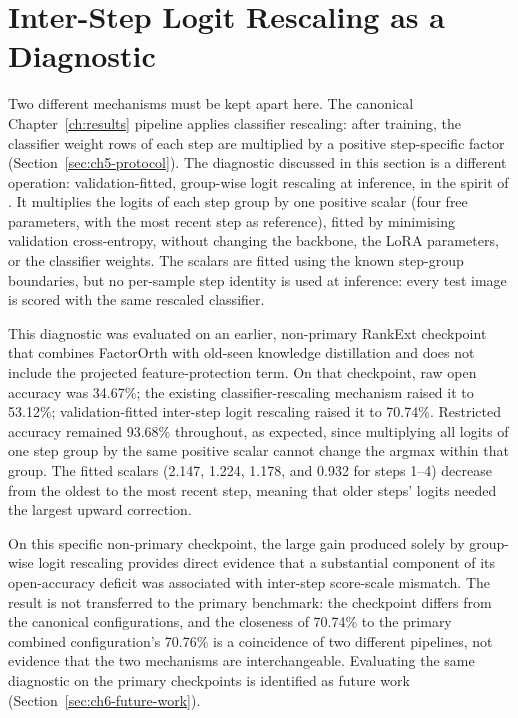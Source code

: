 \section{Inter-Step Logit Rescaling as a Diagnostic}
\label{sec:ch6-calibration}

Two different mechanisms must be kept apart here. The canonical
Chapter~\ref{ch:results} pipeline applies classifier rescaling: after
training, the classifier weight rows of each step are multiplied by a
positive step-specific factor (Section~\ref{sec:ch5-protocol}). The
diagnostic discussed in this section is a different operation:
validation-fitted, group-wise logit rescaling at inference, in the spirit of
\textcite{zhao2020maintaining}. It multiplies the logits of each step group
by one positive scalar (four free parameters, with the most recent step as
reference), fitted by minimising validation cross-entropy, without changing
the backbone, the LoRA parameters, or the classifier weights. The scalars
are fitted using the known step-group boundaries, but no per-sample step
identity is used at inference: every test image is scored with the same
rescaled classifier.

This diagnostic was evaluated on an earlier, non-primary RankExt checkpoint
that combines FactorOrth with old-seen knowledge distillation and does not
include the projected feature-protection term. On that checkpoint, raw open
accuracy was 34.67\%; the existing classifier-rescaling mechanism raised it
to 53.12\%; validation-fitted inter-step logit rescaling raised it to
70.74\%. Restricted accuracy remained 93.68\% throughout, as expected, since
multiplying all logits of one step group by the same positive scalar cannot
change the argmax within that group. The fitted scalars (2.147, 1.224,
1.178, and 0.932 for steps 1--4) decrease from the oldest to the most recent
step, meaning that older steps' logits needed the largest upward correction.

On this specific non-primary checkpoint, the large gain produced solely by
group-wise logit rescaling provides direct evidence that a substantial
component of its open-accuracy deficit was associated with inter-step
score-scale mismatch. The result is not transferred to the primary
benchmark: the checkpoint differs from the canonical configurations, and
the closeness of 70.74\% to the primary combined configuration's 70.76\% is
a coincidence of two different pipelines, not evidence that the two
mechanisms are interchangeable. Evaluating the same diagnostic on the
primary checkpoints is identified as future work
(Section~\ref{sec:ch6-future-work}).

